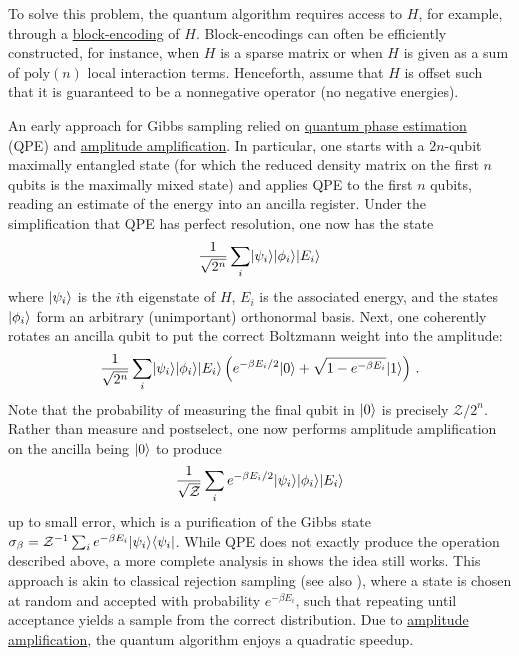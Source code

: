 \begin{refsection}
To solve this problem, the quantum algorithm requires access to $H$, for example, through a \hyperref[prim:BlockEncodings]{block-encoding} of $H$. Block-encodings  can often be efficiently constructed, for instance, when $H$ is a sparse matrix or when $H$ is given as a sum of $\text{poly}(n)$ local interaction terms. Henceforth, assume that $H$ is offset such that it is guaranteed to be a nonnegative operator (no negative energies). 

An early approach \cite{poulin2009GibbsSamplingAndEval} for Gibbs sampling relied on \hyperref[prim:QPE]{quantum phase estimation} (QPE) and \hyperref[prim:AmpAmp]{amplitude amplification}. In particular, one starts with a $2n$-qubit maximally entangled state (for which the reduced density matrix on the first $n$ qubits is the maximally mixed state) and applies QPE to the first $n$ qubits, reading an estimate of the energy into an ancilla register. Under the simplification that QPE has perfect resolution, one now has the state
\begin{equation}
   \frac{1}{\sqrt{2^n}} \sum_{i} \lvert\psi_i\rangle \lvert\phi_i\rangle \lvert E_i\rangle
\end{equation}
where $\lvert\psi_i\rangle$ is the $i$th eigenstate of $H$, $E_i$ is the associated energy, and the states $\lvert\phi_i\rangle$ form an arbitrary (unimportant) orthonormal basis. Next, one coherently rotates an ancilla qubit to put the correct Boltzmann weight into the amplitude:
\begin{equation}
    \frac{1}{\sqrt{2^{n}}}\sum_{i} \lvert\psi_i\rangle \lvert\phi_i\rangle \lvert E_i\rangle\left(e^{-\beta E_i/2}\lvert0\rangle + \sqrt{1-e^{-\beta E_i}}\lvert1\rangle\right)\,.
\end{equation}
Note that the probability of measuring the final qubit in $\lvert0\rangle$ is precisely $\mathcal{Z}/2^n$. Rather than measure and postselect, one now performs amplitude amplification on the ancilla being $\lvert0\rangle$ to produce 
\begin{equation}
    \frac{1}{\sqrt{\mathcal{Z}}} \sum_i e^{-\beta E_i/2}\lvert\psi_i\rangle\lvert\phi_i\rangle\lvert E_i\rangle
\end{equation}
up to small error, which is a purification of the Gibbs state $\sigma_\beta = \mathcal{Z}^{-1}\sum_i e^{-\beta E_i} \lvert\psi_i\rangle\langle\psi_i\rvert$. While QPE does not exactly produce the operation described above, a more complete analysis in \cite{poulin2009GibbsSamplingAndEval,chiang2010quantum} shows the idea still works. This approach is akin to classical rejection sampling (see also \cite{ozols2013QuantumRejectionSampling}), where a state is chosen at random and accepted with probability $e^{-\beta E_i}$, such that repeating until acceptance yields a sample from the correct distribution. Due to \hyperref[prim:AmpAmp]{amplitude amplification}, the quantum algorithm enjoys a quadratic speedup. 


\end{refsection}
